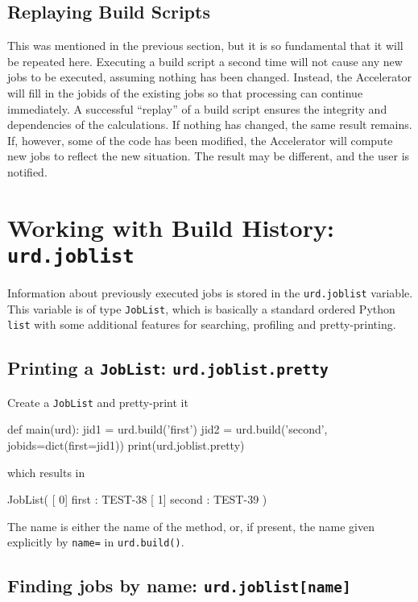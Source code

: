 \subsection{Replaying Build Scripts}
This was mentioned in the previous section, but it is so fundamental
that it will be repeated here.  Executing a build script a second time
will not cause any new jobs to be executed, assuming nothing has been
changed.  Instead, the Accelerator will fill in the jobids of the
existing jobs so that processing can continue immediately.  A
successful ``replay'' of a build script ensures the integrity and
dependencies of the calculations.  If nothing has changed, the same
result remains.  If, however, some of the code has been modified, the
Accelerator will compute new jobs to reflect the new situation.  The
result may be different, and the user is notified.




\section{Working with Build History:  \texttt{urd.joblist}}
\label{sec:joblist}

Information about previously executed jobs is stored in
the \texttt{urd.joblist} variable.  This variable is of
type \texttt{JobList}, which is basically a standard ordered
Python \texttt{list} with some additional features for searching,
profiling and pretty-printing.




\subsection{Printing a \texttt{JobList}:  \texttt{urd.joblist.pretty}}

Create a \texttt{JobList} and pretty-print it
\begin{python}
def main(urd):
    jid1 = urd.build('first')
    jid2 = urd.build('second', jobids=dict(first=jid1))
    print(urd.joblist.pretty)
\end{python}
which results in
\begin{shell}
JobList(
   [  0]  first : TEST-38
   [  1] second : TEST-39
)
\end{shell}
The name is either the name of the method, or, if present, the name
given explicitly by \texttt{name=} in \texttt{urd.build()}.




\subsection{Finding jobs by name:  \texttt{urd.joblist[name]}}
\label{sec:clumsy_dot_jobid}

